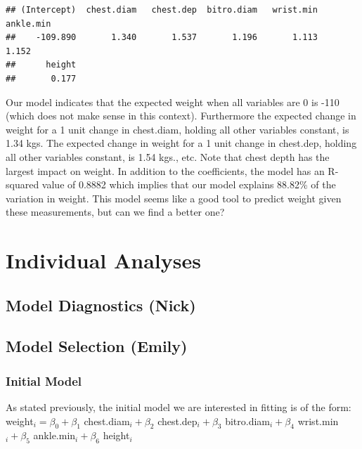 \documentclass[11pt]{article}\usepackage[]{graphicx}\usepackage[]{color}
\makeatletter
\newenvironment{kframe}{%
 \def\at@end@of@kframe{}%
 \ifinner\ifhmode%
  \def\at@end@of@kframe{\end{minipage}}%
  \begin{minipage}{\columnwidth}%
 \fi\fi%
 \def\FrameCommand##1{\hskip\@totalleftmargin \hskip-\fboxsep
 \colorbox{shadecolor}{##1}\hskip-\fboxsep
     \hskip-\linewidth \hskip-\@totalleftmargin \hskip\columnwidth}%
 \MakeFramed {\advance\hsize-\width
   \@totalleftmargin\z@ \linewidth\hsize
   \@setminipage}}%
 {\par\unskip\endMakeFramed%
 \at@end@of@kframe}
\newenvironment{knitrout}{}{} %
\makeatother
\begin{document}
\begin{knitrout}
\color{fgcolor}\begin{kframe}
\begin{verbatim}
## (Intercept)  chest.diam   chest.dep  bitro.diam   wrist.min   ankle.min 
##    -109.890       1.340       1.537       1.196       1.113       1.152 
##      height 
##       0.177
\end{verbatim}
\end{kframe}
\end{knitrout}


Our model indicates that the expected weight when all variables are 0 is -110 (which does not make sense in this context). Furthermore the expected change in weight for a 1 unit change in chest.diam, holding all other variables constant, is 1.34 kgs. The expected change in weight for a 1 unit change in chest.dep, holding all other variables constant, is 1.54 kgs., etc. Note that chest depth has the largest impact on weight. In addition to the coefficients, the model has an R-squared value of 0.8882 which implies that our model explains 88.82\% of the variation in weight. This model seems like a good tool to predict weight given these measurements, but can we find a better one?

\newpage

\section{Individual Analyses}

\subsection{Model Diagnostics (Nick)} %



\newpage

\subsection{Model Selection (Emily)} %

\subsubsection{Initial Model}

As stated previously, the initial model we are interested in fitting is of the form:\\
weight$_i = \beta_0 + \beta_1$ chest.diam$_{i} + \beta_2$ chest.dep$_{i} + \beta_3$ bitro.diam$_{i} + \beta_4$ wrist.min$_{i} + \beta_5$ ankle.min$_{i} + \beta_6$ height$_{i}$
\end{document}
